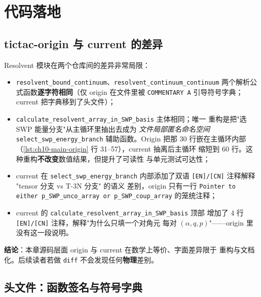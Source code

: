 \section{代码落地}
\label{sec:ch10-code}

\subsection{tictac-origin 与 current 的差异}
\label{subsec:ch10-origin-current-diff}

Resolvent 模块在两个仓库间的差异非常局限：

\begin{itemize}
  \item \texttt{resolvent\_bound\_continuum}、\texttt{resolvent\_continuum\_continuum}
        两个解析公式函数\textbf{逐字符相同}（仅 origin 在文件里被
        \texttt{COMMENTARY A} 引导符号字典；current 把字典移到了头文件）；
  \item \texttt{calculate\_resolvent\_array\_in\_SWP\_basis} 主体相同；唯一
        重构是把"选 SWP 能量分支"从主循环里抽出去成为
        \emph{文件局部匿名命名空间} \texttt{select\_swp\_energy\_branch}
        辅助函数。Origin 把那 30 行嵌在主循环内部
        （\cref{lst:ch10-main-origin} 行 31--57），current 抽离后主循环
        缩短到 60 行。这种重构\textbf{不改变}数值结果，但提升了可读性
        与单元测试可达性；
  \item current 在 \texttt{select\_swp\_energy\_branch} 内部添加了双语
        \texttt{[EN]/[CN]} 注释解释 "tensor 分支 vs T-3N 分支" 的语义
        差别，origin 只有一行 \texttt{Pointer to either p\_SWP\_unco\_array
        or p\_SWP\_coup\_array} 的笼统注释；
  \item current 的 \texttt{calculate\_resolvent\_array\_in\_SWP\_basis} 顶部
        增加了 4 行 \texttt{[EN]/[CN]} 注释，解释"为什么只填一个对角元
        每对 \((α, q, p)\)"——origin 里没有这一段说明。
\end{itemize}

\textbf{结论}：本章源码层面 origin 与 current 在数学上等价、字面差异限于
重构与文档化。后续读者若做 \texttt{diff} 不会发现任何\textbf{物理}差别。

\subsection{头文件：函数签名与符号字典}
\label{subsec:ch10-header}

